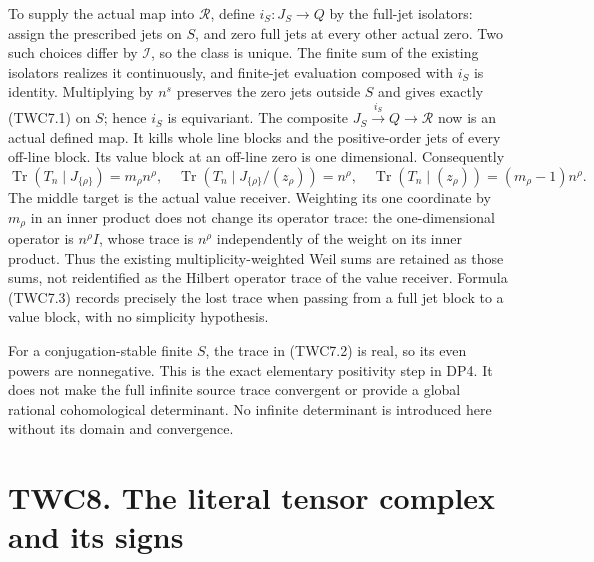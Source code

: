 To supply the actual map into \(\mathcal R\), define \(i_S:J_S\to Q\) by
the full-jet isolators: assign the prescribed jets on \(S\), and zero
full jets at every other actual zero. Two such choices differ by
\(\mathcal I\), so the class is unique. The finite sum of the existing
isolators realizes it continuously, and finite-jet evaluation composed
with \(i_S\) is identity. Multiplying by \(n^s\) preserves the zero jets
outside \(S\) and gives exactly (TWC7.1) on \(S\); hence \(i_S\) is
equivariant. The composite \(J_S\xrightarrow{i_S}Q\to\mathcal R\) now is
an actual defined map. It kills whole line blocks and the positive-order
jets of every off-line block. Its value block at an off-line zero is one
dimensional. Consequently \[
\operatorname{Tr}(T_n\mid J_{\{\rho\}})=m_\rho n^\rho,
\quad
\operatorname{Tr}(T_n\mid J_{\{\rho\}}/(z_\rho))=n^\rho,
\quad
\operatorname{Tr}(T_n\mid (z_\rho))=(m_\rho-1)n^\rho.
\tag{TWC7.3}
\] The middle target is the actual value receiver. Weighting its one
coordinate by \(m_\rho\) in an inner product does not change its
operator trace: the one-dimensional operator is \(n^\rho I\), whose
trace is \(n^\rho\) independently of the weight on its inner product.
Thus the existing multiplicity-weighted Weil sums are retained as those
sums, not reidentified as the Hilbert operator trace of the value
receiver. Formula (TWC7.3) records precisely the lost trace when passing
from a full jet block to a value block, with no simplicity hypothesis.

For a conjugation-stable finite \(S\), the trace in (TWC7.2) is real, so
its even powers are nonnegative. This is the exact elementary positivity
step in DP4. It does not make the full infinite source trace convergent
or provide a global rational cohomological determinant. No infinite
determinant is introduced here without its domain and convergence.

\section{TWC8. The literal tensor complex and its
signs}\label{twc8.-the-literal-tensor-complex-and-its-signs}

